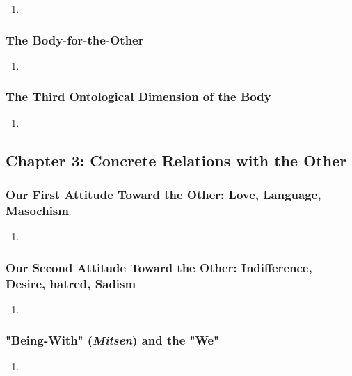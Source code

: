 \begin{enumerate}
  \item
\end{enumerate}

\subsubsection{The Body-for-the-Other}

\begin{enumerate}
  \item
\end{enumerate}

\subsubsection{The Third Ontological Dimension of the Body}

\begin{enumerate}
  \item
\end{enumerate}

\subsection{Chapter 3: Concrete Relations with the Other}

\subsubsection{Our First Attitude Toward the Other: Love, Language, Masochism}

\begin{enumerate}
  \item
\end{enumerate}

\subsubsection{Our Second Attitude Toward the Other: Indifference, Desire, hatred, Sadism}

\begin{enumerate}
  \item
\end{enumerate}

\subsubsection{"Being-With" (\emph{Mitsen}) and the "We"}

\begin{enumerate}
  \item
\end{enumerate}
